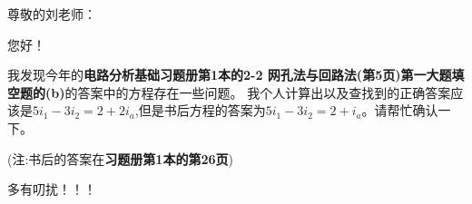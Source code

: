 \documentclass[UTF8]{ctexart}
\begin{document}
\noindent 尊敬的刘老师：

您好！

我发现今年的\textbf{电路分析基础习题册第1本的2-2 网孔法与回路法(第5页)第一大题填空题的(b)}的答案中的方程存在一些问题。
我个人计算出以及查找到的正确答案应该是$5i_1 - 3i_2 = 2 + 2i_a$,但是书后方程的答案为$5i_1 - 3i_2 = 2 + i_a$。请帮忙确认一下。


\noindent (注:书后的答案在\textbf{习题册第1本的第26页})


多有叨扰！！！


\end{document}

